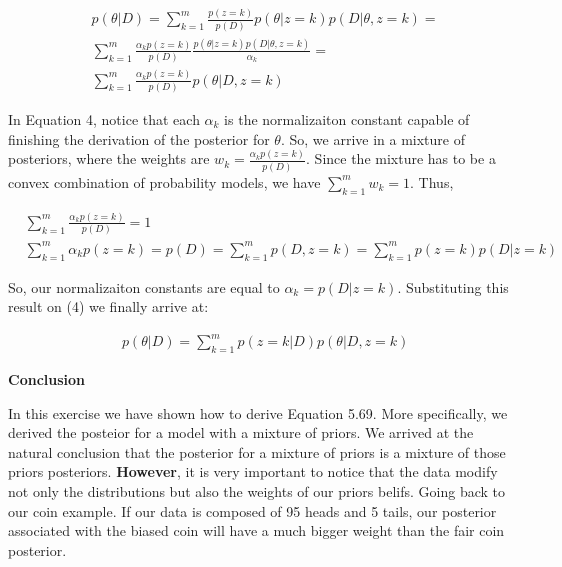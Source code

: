 \documentclass[a4paper,10pt]{book}
\begin{document}
\begin{equation}
\begin{split}
& p(\theta | D) =  \sum_{k=1}^m \frac{p(z=k)}{p(D)} p(\theta|z=k)p(D |\theta, z=k) = \\
& \sum_{k=1}^m \frac{\alpha_kp(z=k)}{p(D)} \frac{p(\theta|z=k)p(D |\theta, z=k)}{\alpha_k} = \\
& \sum_{k=1}^m \frac{\alpha_kp(z=k)}{p(D)} p(\theta | D, z = k)
\end{split}
\end{equation}

In Equation 4, notice that each $\alpha_k$ is the normalizaiton constant capable of finishing the derivation of the posterior for $\theta$.
So, we arrive in a mixture of posteriors, where the weights are $w_k = \frac{\alpha_kp(z=k)}{p(D)}$. Since the mixture has to be a convex combination
of probability models, we have $\sum_{k=1}^m w_k = 1$. Thus, 

\begin{equation}
\begin{split}
& \sum_{k=1}^m\frac{\alpha_kp(z=k)}{p(D)} = 1 \\
& \sum_{k=1}^m\alpha_kp(z=k) = p(D) = \sum_{k=1}^mp(D, z = k) = \sum_{k=1}^mp(z= k)p(D | z= k)
\end{split}
\end{equation}

So, our normalizaiton constants are equal to $\alpha_k = p(D | z = k)$. Substituting this result on (4) we finally arrive at:

\begin{equation}
\begin{split}
& p(\theta | D) = \sum_{k=1}^mp(z = k | D) p(\theta | D, z = k)
\end{split}
\end{equation}


\textbf{Conclusion} \par
In this exercise we have shown how to derive Equation 5.69. More specifically, we derived the posteior for a model with a mixture of priors. We arrived at the natural 
conclusion that the posterior for a mixture of priors is a mixture of those priors posteriors. \textbf{However}, it is very important to notice that the data
modify not only the distributions but also the weights of our priors belifs. Going back to our coin example. If our data is composed of 95 heads and 5 tails,
our posterior associated with the biased coin will have a much bigger weight than the fair coin posterior.
\end{document}
